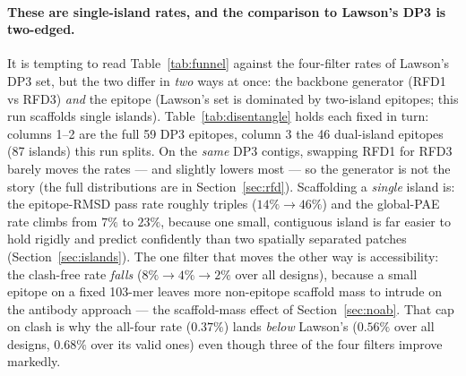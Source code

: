 \paragraph{These are single-island rates, and the comparison to Lawson's DP3 is two-edged.}
It is tempting to read Table~\ref{tab:funnel} against the four-filter rates of Lawson's DP3 set,
but the two differ in \emph{two} ways at once: the backbone generator (RFD1 vs RFD3) \emph{and}
the epitope (Lawson's set is dominated by two-island epitopes; this run scaffolds single
islands). Table~\ref{tab:disentangle} holds each fixed in turn: columns 1--2 are the full 59 DP3
epitopes, column 3 the \num{46} dual-island epitopes (\num{87} islands) this run splits.
On the \emph{same} DP3 contigs, swapping RFD1 for RFD3 barely moves the rates --- and slightly
lowers most --- so the generator is not the story (the full distributions are in
Section~\ref{sec:rfd}). Scaffolding a \emph{single} island is: the epitope-RMSD pass rate
roughly triples ($14\% \to 46\%$) and the global-PAE rate climbs from $7\%$ to $23\%$, because
one small, contiguous island is far easier to hold rigidly and predict confidently than two
spatially separated patches (Section~\ref{sec:islands}). The one filter that moves the other way
is accessibility: the clash-free rate \emph{falls} ($8\% \to 4\% \to 2\%$ over all designs),
because a small epitope on a fixed \num{103}-mer leaves more non-epitope scaffold mass to intrude
on the antibody approach --- the scaffold-mass effect of Section~\ref{sec:noab}. That cap on
clash is why the all-four rate ($0.37\%$) lands \emph{below} Lawson's ($0.56\%$ over all designs,
$0.68\%$ over its valid ones) even though three of the four filters improve markedly.

